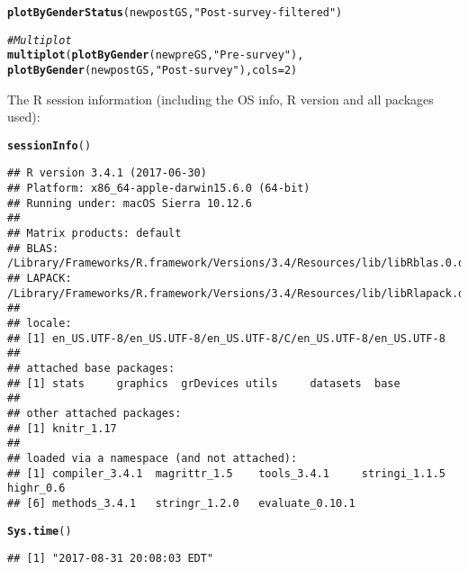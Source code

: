 \documentclass{article}\usepackage[]{graphicx}\usepackage[]{color}
\makeatletter
\newcommand{\hlnum}[1]{\textcolor[rgb]{0.686,0.059,0.569}{#1}}%
\newcommand{\hlstr}[1]{\textcolor[rgb]{0.192,0.494,0.8}{#1}}%
\newcommand{\hlcom}[1]{\textcolor[rgb]{0.678,0.584,0.686}{\textit{#1}}}%
\newcommand{\hlstd}[1]{\textcolor[rgb]{0.345,0.345,0.345}{#1}}%
\newcommand{\hlkwc}[1]{\textcolor[rgb]{0.333,0.667,0.333}{#1}}%
\newcommand{\hlkwd}[1]{\textcolor[rgb]{0.737,0.353,0.396}{\textbf{#1}}}%
\newenvironment{kframe}{%
 \def\at@end@of@kframe{}%
 \ifinner\ifhmode%
  \def\at@end@of@kframe{\end{minipage}}%
  \begin{minipage}{\columnwidth}%
 \fi\fi%
 \def\FrameCommand##1{\hskip\@totalleftmargin \hskip-\fboxsep
 \colorbox{shadecolor}{##1}\hskip-\fboxsep
     \hskip-\linewidth \hskip-\@totalleftmargin \hskip\columnwidth}%
 \MakeFramed {\advance\hsize-\width
   \@totalleftmargin\z@ \linewidth\hsize
   \@setminipage}}%
 {\par\unskip\endMakeFramed%
 \at@end@of@kframe}
\newenvironment{knitrout}{}{} %
\makeatother
\begin{document}
\begin{knitrout}
\begin{kframe}
{\ttfamily\noindent\bfseries{}}\begin{alltt}
\hlkwd{plotByGenderStatus}\hlstd{(newpostGS,} \hlstr{"Post-survey-filtered"}\hlstd{)}
\end{alltt}


{\ttfamily\noindent\bfseries{}}\begin{alltt}
\hlcom{# Multiplot}
\hlkwd{multiplot}\hlstd{(}\hlkwd{plotByGender}\hlstd{(newpreGS,} \hlstr{"Pre-survey"}\hlstd{),}
          \hlkwd{plotByGender}\hlstd{(newpostGS,} \hlstr{"Post-survey"}\hlstd{),} \hlkwc{cols}\hlstd{=}\hlnum{2}\hlstd{)}
\end{alltt}


{\ttfamily\noindent\bfseries{}}\end{kframe}
\end{knitrout}

The R session information (including the OS info, R version and all
packages used):

\begin{knitrout}
\color{fgcolor}\begin{kframe}
\begin{alltt}
\hlkwd{sessionInfo}\hlstd{()}
\end{alltt}
\begin{verbatim}
## R version 3.4.1 (2017-06-30)
## Platform: x86_64-apple-darwin15.6.0 (64-bit)
## Running under: macOS Sierra 10.12.6
## 
## Matrix products: default
## BLAS: /Library/Frameworks/R.framework/Versions/3.4/Resources/lib/libRblas.0.dylib
## LAPACK: /Library/Frameworks/R.framework/Versions/3.4/Resources/lib/libRlapack.dylib
## 
## locale:
## [1] en_US.UTF-8/en_US.UTF-8/en_US.UTF-8/C/en_US.UTF-8/en_US.UTF-8
## 
## attached base packages:
## [1] stats     graphics  grDevices utils     datasets  base     
## 
## other attached packages:
## [1] knitr_1.17
## 
## loaded via a namespace (and not attached):
## [1] compiler_3.4.1  magrittr_1.5    tools_3.4.1     stringi_1.1.5   highr_0.6      
## [6] methods_3.4.1   stringr_1.2.0   evaluate_0.10.1
\end{verbatim}
\begin{alltt}
\hlkwd{Sys.time}\hlstd{()}
\end{alltt}
\begin{verbatim}
## [1] "2017-08-31 20:08:03 EDT"
\end{verbatim}
\end{kframe}
\end{knitrout}
\end{document}
